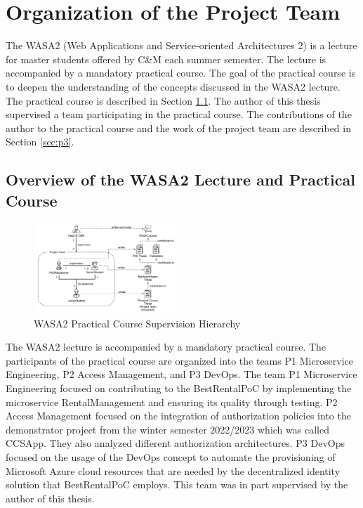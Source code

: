 \chapter{Organization of the Project Team}
\label{cha:projektteam-arbeiten}

The WASA2 (Web Applications and Service-oriented Architectures 2) is a lecture for master students
offered by C\&M each summer semester. The lecture is accompanied by a mandatory practical course.
The goal of the practical course is to deepen the understanding of the concepts discussed in the WASA2
lecture. The practical course is described in Section \ref{sec:wasa2_overview}.
The author of this thesis supervised a team participating in the practical course.
The contributions of the author to the practical course and the work of the project team are described in Section \ref{sec:p3}.

\section{Overview of the WASA2 Lecture and Practical Course}
\label{sec:wasa2_overview}

\begin{figure}[tb]
	\centering
	\includegraphics[width=0.5\textwidth]{figures/practical_course_roles.png}
	\caption{WASA2 Practical Course Supervision Hierarchy \cite{CM-W-INT}}
	\label{fig:practical_course_roles}
\end{figure}

The WASA2 lecture is accompanied by a mandatory practical course.
The participants of the practical course are organized into the teams P1 Microservice Engineering,
P2 Access Management, and P3 DevOps. The team P1 Microservice Engineering focused on contributing
to the BestRentalPoC by implementing the microservice RentalManagement and ensuring its
quality through testing.
P2 Access Management focused on the integration of authorization policies into the demonstrator
project from the winter semester 2022/2023 which was called CCSApp. They also analyzed
different authorization architectures.
P3 DevOps focused on the usage of the DevOps concept to automate the provisioning
of Microsoft Azure cloud resources that are needed by the decentralized identity solution
that BestRentalPoC employs. This team was in part supervised by the author of this thesis.


